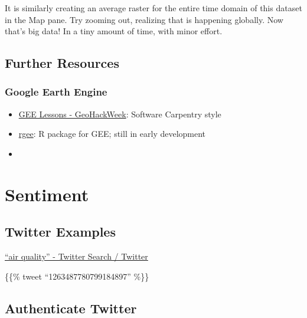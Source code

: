 \documentclass[]{book}
\providecommand{\tightlist}{%
  \setlength{\itemsep}{0pt}\setlength{\parskip}{0pt}}
\begin{document}
It is similarly creating an average raster for the entire time domain of this dataset in the Map pane. Try zooming out, realizing that is happening globally. Now that's big data! In a tiny amount of time, with minor effort.

\hypertarget{further-resources}{%
\section*{Further Resources}\label{further-resources}}

\hypertarget{google-earth-engine}{%
\subsection*{Google Earth Engine}\label{google-earth-engine}}

\begin{itemize}
\tightlist
\item
  \href{https://geohackweek.github.io/GoogleEarthEngine/}{GEE Lessons - GeoHackWeek}: Software Carpentry style
\item
  \href{https://r-spatial.github.io/rgee/}{rgee}: R package for GEE; still in early development
\item
  \citep{gorelickGoogleEarthEngine2017a}
\end{itemize}

\hypertarget{sentiment}{%
\chapter{Sentiment}\label{sentiment}}

\hypertarget{twitter-examples}{%
\section{Twitter Examples}\label{twitter-examples}}

\href{https://twitter.com/search?q=\%22air\%20quality\%22\&src=typed_query}{``air quality'' - Twitter Search / Twitter}

\{\{\% tweet ``1263487780799184897'' \%\}\}

\hypertarget{authenticate-twitter}{%
\section{Authenticate Twitter}\label{authenticate-twitter}}
\end{document}
